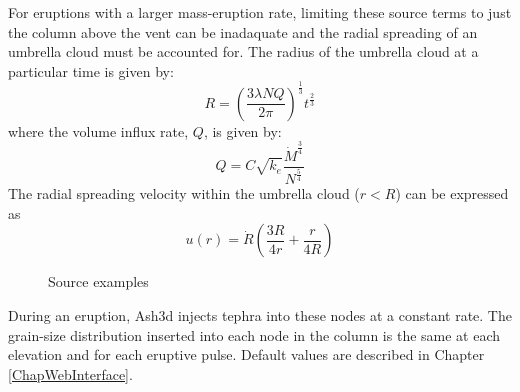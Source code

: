 For eruptions with a larger mass-eruption rate, limiting these source terms to just
the column above the vent can be inadaquate and the radial spreading of an
umbrella cloud must be accounted for. The radius of the umbrella cloud at a
particular time is given by:
\begin{equation}
 R = \left( \frac{3 \lambda N Q}{2 \pi}\right)^{\frac{1}{3}} t^{\frac{2}{3}}  \label{EqUmbRad}
\end{equation}
where the volume influx rate, $Q$, is given by:
\begin{equation}
 Q = C \sqrt{k_e} \frac{\dot{M}^{\frac{3}{4}}}{N^{\frac{5}{4}}} \label{EqUmbQ}
\end{equation}
The radial spreading velocity within the umbrella cloud ($r<R$) can be expressed as
\begin{equation}
 u(r) = \dot{R} \left( \frac{3 R}{4 r} + \frac{r}{4R}\right) \label{EqUmbRadVelCost}
\end{equation}




\begin{figure}[htbp]
\parbox{15cm}{\caption{\label{FigSourceExample}
Source examples}}
\end{figure}

During an eruption, Ash3d injects tephra into these nodes at a constant
rate. The grain-size distribution inserted into each node in the column
is the same at each elevation and for each eruptive pulse.
Default values are described in Chapter \ref{ChapWebInterface}.

